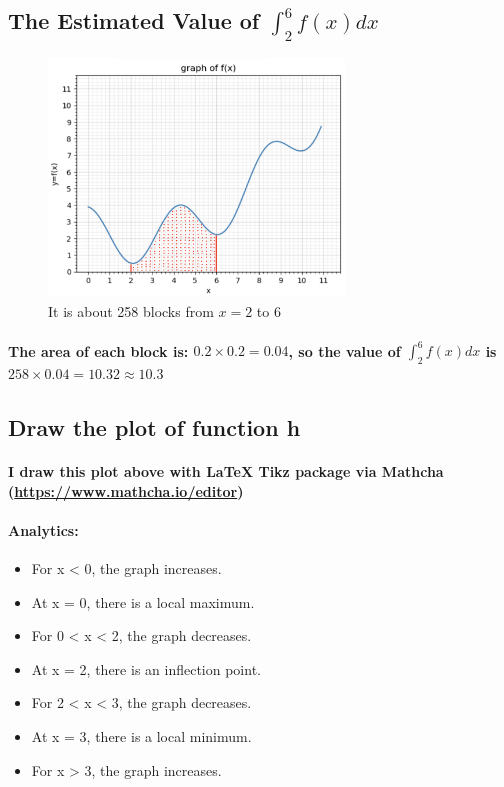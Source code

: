 \subsection{The Estimated Value of $\int^6_2 f(x)dx$}
\begin{figure}[H]
    \centering
    \includegraphics[width=0.7\textwidth]{pic/q2b.jpeg}
    \caption{It is about 258 blocks from $x=2$ to $6$}
\end{figure}
% 
% 
% 
\paragraph{The area of each block is: $0.2 \times 0.2 = 0.04$, so the value of $ \int^6_2 f(x)dx $ is $ 258 \times 0.04 = 10.32 \approx \mathbf{10.3} $}
% 
% 
% 
% 
% 
% 
% 
% 
% 
\subsection{Draw the plot of function h}
% 
% 
% 
\begin{center}
    
\end{center}
% 
% 
\paragraph{I draw this plot above with LaTeX Tikz package via Mathcha (\href{https://www.mathcha.io/editor}{https://www.mathcha.io/editor})}
% 
% 
\paragraph{\textbf{Analytics:}}
\begin{itemize}
    \item For x < 0, the graph increases.
    \item At x = 0, there is a local maximum.
    \item For 0 < x < 2, the graph decreases.
    \item At x = 2, there is an inflection point.
    \item For 2 < x < 3, the graph decreases.
    \item At x = 3, there is a local minimum.
    \item For x > 3, the graph increases.
\end{itemize}
% 
% 
% 
% 
